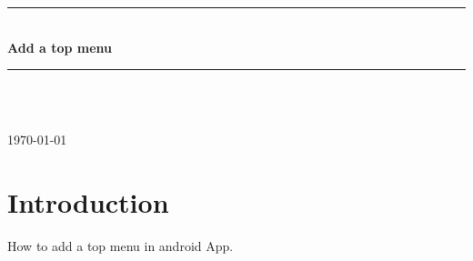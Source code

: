\documentclass[12pt]{article} %
\begin{document}

\begin{titlepage}

\newcommand{\HRule}{\rule{\linewidth}{0.5mm}} %

\center %

\HRule \\[0.4cm]
{ \huge \bfseries Add a top menu}\\[0.4cm] %
\HRule \\[1.5cm]

\begin{minipage}{0.4\textwidth}
\end{minipage}\\[4cm]

{\large \today}\\[3cm] %


\vfill %

\end{titlepage}


\tableofcontents %

\newpage %


\section{Introduction} %

How to add a top menu in android App.
\end{document}
